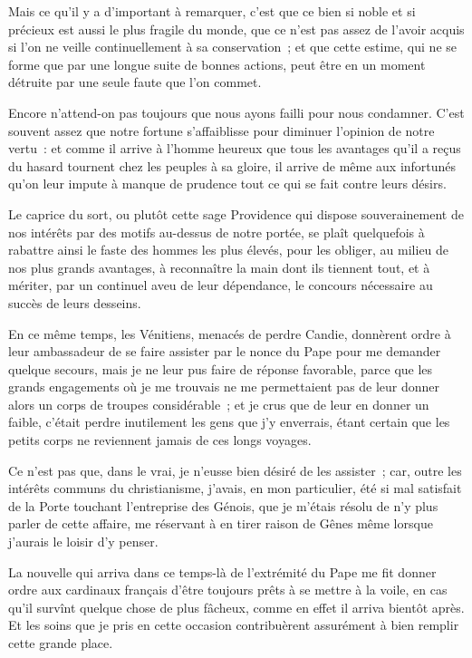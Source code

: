 \documentclass[french,twoside]{book} %
\begin{document}
Mais ce qu’il y a d’important à remarquer, c’est que ce bien si noble et si précieux est aussi le plus fragile du monde, que ce n’est pas assez de l’avoir acquis si l’on ne veille continuellement à sa conservation ; et que cette estime, qui ne se forme que par une longue suite de bonnes actions, peut être en un moment détruite par une seule faute que l’on commet.\par
Encore n’attend-on pas toujours que nous ayons failli pour nous condamner. C’est souvent assez que notre fortune s’affaiblisse pour diminuer l’opinion de notre vertu : et comme il arrive à l’homme heureux que tous les avantages qu’il a reçus du hasard tournent chez les peuples à sa gloire, il arrive de même aux infortunés qu’on leur impute à manque de prudence tout ce qui se fait contre leurs désirs.\par
Le caprice du sort, ou plutôt cette sage Providence qui dispose souverainement de nos intérêts par des motifs au-dessus de notre portée, se plaît quelquefois à rabattre ainsi le faste des hommes les plus élevés, pour les obliger, au milieu de nos plus grands avantages, à reconnaître la main dont ils tiennent tout, et à mériter, par un continuel aveu de leur dépendance, le concours nécessaire au succès de leurs desseins.\par
En ce même temps, les Vénitiens, menacés de perdre Candie, donnèrent ordre à leur ambassadeur de se faire assister par le nonce du Pape pour me demander quelque secours, mais je ne leur pus faire de réponse favorable, parce que les grands engagements où je me trouvais ne me permettaient pas de leur donner alors un corps de troupes considérable ; et je crus que de leur en donner un faible, c’était perdre inutilement les gens que j’y enverrais, étant certain que les petits corps ne reviennent jamais de ces longs voyages.\par
Ce n’est pas que, dans le vrai, je n’eusse bien désiré de les assister ; car, outre les intérêts communs du christianisme, j’avais, en mon particulier, été si mal satisfait de la Porte touchant l’entreprise des Génois, que je m’étais résolu de n’y plus parler de cette affaire, me réservant à en tirer raison de Gênes même lorsque j’aurais le loisir d’y penser.\par
La nouvelle qui arriva dans ce temps-là de l’extrémité du Pape me fit donner ordre aux cardinaux français d’être toujours prêts à se mettre à la voile, en cas qu’il survînt quelque chose de plus fâcheux, comme en effet il arriva bientôt après. Et les soins que je pris en cette occasion contribuèrent assurément à bien remplir cette grande place.\par
\end{document}
